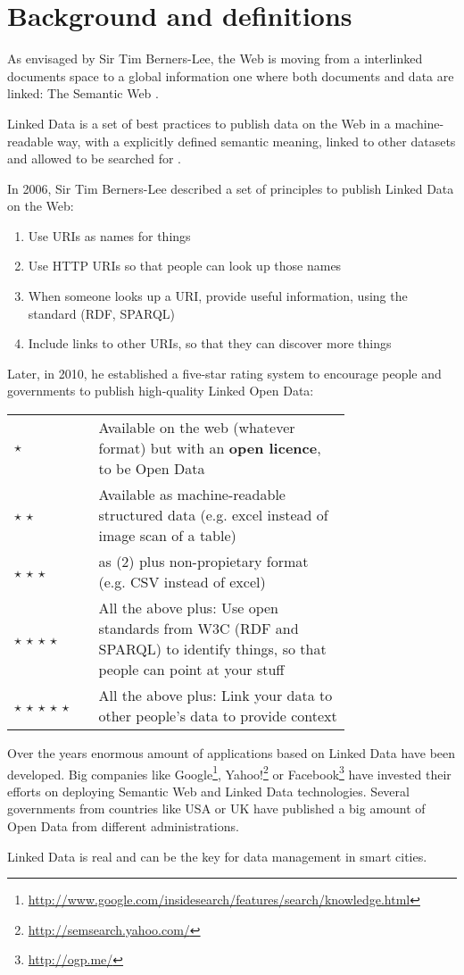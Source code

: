 \section{Background and definitions}
\label{subsec:background}

As envisaged by Sir Tim Berners-Lee, the Web is moving from a interlinked documents space to a global information one where both documents and data are linked: The Semantic Web \cite{berners2001semantic}.

Linked Data is a set of best practices to publish data on the Web in a machine-readable way, with a explicitly defined semantic meaning, linked to other datasets and allowed to be searched for \cite{bizer2009linked}.

In 2006, Sir Tim Berners-Lee described a set of principles to publish Linked Data on the Web:

\begin{enumerate}
  \item Use URIs as names for things
  \item Use HTTP URIs so that people can look up those names
  \item When someone looks up a URI, provide useful information, using the standard (RDF, SPARQL)
  \item Include links to other URIs, so that they can discover more things \\[\baselineskip]
\end{enumerate} 

Later, in 2010, he established a five-star rating system to encourage people and governments to publish high-quality Linked Open Data: 

\begin{tabular}{ l p{0.75\linewidth} }
  $\star$ & Available on the web (whatever format) but with an \textbf{open licence}, to be Open Data \\
  $\star$ $\star$ & Available as machine-readable structured data (e.g. excel instead of image scan of a table) \\
  $\star$ $\star$ $\star$ & as (2) plus non-propietary format (e.g. CSV instead of excel) \\
  $\star$ $\star$ $\star$ $\star$ & All the above plus: Use open standards from W3C (RDF and SPARQL) to identify things, so that people can point at your stuff \\
  $\star$ $\star$ $\star$ $\star$ $\star$ & All the above plus: Link your data to other people's data to provide context \\[\baselineskip]
\end{tabular}

Over the years enormous amount of applications based on Linked Data have been developed. Big companies like Google\footnote{\url{http://www.google.com/insidesearch/features/search/knowledge.html}}, Yahoo!\footnote{\url{http://semsearch.yahoo.com/}} or Facebook\footnote{\url{http://ogp.me/}} have invested their efforts on deploying Semantic Web and Linked Data technologies. Several governments from countries like USA or UK have published a big amount of Open Data from different administrations. 

Linked Data is real and can be the key for data management in smart cities.

